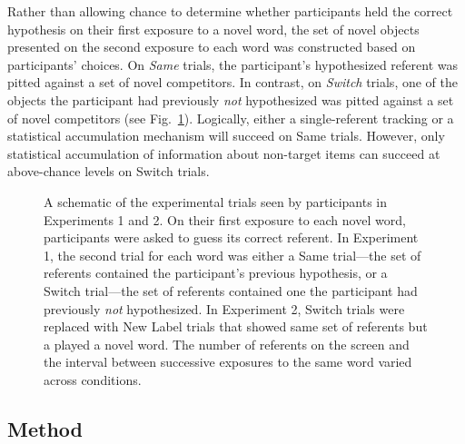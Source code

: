 \documentclass[authoryear,review]{elsarticle}
\begin{document}
Rather than allowing chance to determine whether participants held the correct hypothesis on their first exposure to a novel word, the set of novel objects presented on the second exposure to each word was constructed based on participants' choices. On \emph{Same} trials, the participant's hypothesized referent was pitted against a set of novel competitors. In contrast, on \emph{Switch} trials, one of the objects the participant had previously \emph{not} hypothesized was pitted against a set of novel competitors (see Fig.~\ref{fig:design}). Logically, either a single-referent tracking or a statistical accumulation mechanism will succeed on Same trials. However, only statistical accumulation of information about non-target items can succeed at above-chance levels on Switch trials.

\begin{figure}[tb]
	\caption{\label{fig:design} A schematic of the experimental trials seen by participants in Experiments 1 and 2. On their first exposure to each novel word, participants were asked to guess its correct referent. In Experiment 1, the second trial for each word was either a Same trial---the set of referents contained the participant's previous hypothesis, or a Switch trial---the set of referents contained one the participant had previously \emph{not} hypothesized. In Experiment 2, Switch trials were replaced with New Label trials that showed same set of referents but a played a novel word. The number of referents on the screen and the interval between successive exposures to the same word varied across conditions.}
\end{figure}

\subsection{Method}
\end{document}
